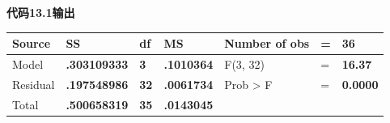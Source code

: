 \documentclass[
  chinese-hans,
  letterpaper,
  DIV=11,
  numbers=noendperiod]{scrreprt}
\newcounter{none} %
\begin{document}
\begin{tcolorbox}[enhanced jigsaw, arc=.35mm, bottomrule=.15mm, breakable, colback=white, colframe=quarto-callout-note-color-frame, left=2mm, leftrule=.75mm, opacityback=0, rightrule=.15mm, toprule=.15mm]

\vspace{-3mm}\textbf{代码13.1输出}\vspace{3mm}

{\def\LTcaptype{none} %
\begin{longtable}[]{@{}
  >{\raggedright\arraybackslash}p{}
  >{\raggedright\arraybackslash}p{}
  >{\raggedright\arraybackslash}p{}
  >{\raggedright\arraybackslash}p{}
  >{\raggedright\arraybackslash}p{}
  >{\raggedright\arraybackslash}p{}
  >{\raggedright\arraybackslash}p{}@{}}
\toprule\noalign{}
\begin{minipage}[b]{\linewidth}\raggedright
Source
\end{minipage} & \begin{minipage}[b]{\linewidth}\raggedright
SS
\end{minipage} & \begin{minipage}[b]{\linewidth}\raggedright
df
\end{minipage} & \begin{minipage}[b]{\linewidth}\raggedright
MS
\end{minipage} & \begin{minipage}[b]{\linewidth}\raggedright
Number of obs
\end{minipage} & \begin{minipage}[b]{\linewidth}\raggedright
=
\end{minipage} & \begin{minipage}[b]{\linewidth}\raggedright
\textbf{36}
\end{minipage} \\
\midrule\noalign{}
\endhead
\bottomrule\noalign{}
\endlastfoot
Model & \textbf{.303109333} & \textbf{3} & \textbf{.1010364} & F(3, 32)
& = & \textbf{16.37} \\
Residual & \textbf{.197548986} & \textbf{32} & \textbf{.0061734} & Prob
\textgreater{} F & = & \textbf{0.0000} \\
Total & \textbf{.500658319} & \textbf{35} & \textbf{.0143045} &

\end{longtable}}
\end{tcolorbox}
\end{document}
